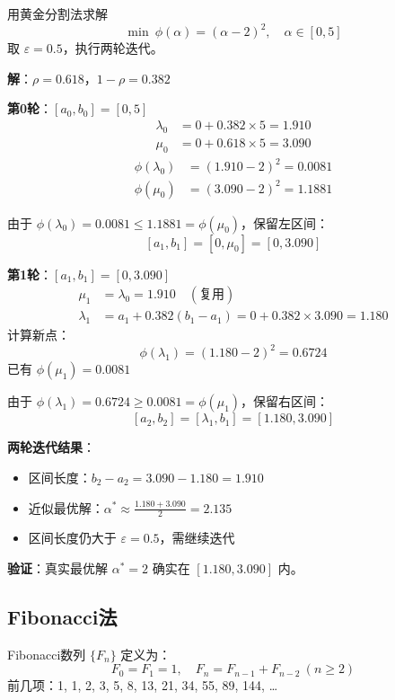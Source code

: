 \begin{example}\label{ex:golden}
用黄金分割法求解
\[
\min\ \phi(\alpha) = (\alpha - 2)^2,\quad \alpha \in [0, 5]
\]
取 $\varepsilon = 0.5$，执行两轮迭代。

\textbf{解}：$\rho = 0.618$，$1-\rho = 0.382$

\textbf{第0轮}：$[a_0, b_0] = [0, 5]$
\begin{align*}
\lambda_0 &= 0 + 0.382 \times 5 = 1.910 \\
\mu_0 &= 0 + 0.618 \times 5 = 3.090
\end{align*}
\begin{align*}
\phi(\lambda_0) &= (1.910 - 2)^2 = 0.0081 \\
\phi(\mu_0) &= (3.090 - 2)^2 = 1.1881
\end{align*}

由于 $\phi(\lambda_0) = 0.0081 \leq 1.1881 = \phi(\mu_0)$，保留左区间：
\[
[a_1, b_1] = [0, \mu_0] = [0, 3.090]
\]

\textbf{第1轮}：$[a_1, b_1] = [0, 3.090]$
\begin{align*}
\mu_1 &= \lambda_0 = 1.910 \quad (\text{复用}) \\
\lambda_1 &= a_1 + 0.382(b_1 - a_1) = 0 + 0.382 \times 3.090 = 1.180
\end{align*}
计算新点：
\[
\phi(\lambda_1) = (1.180 - 2)^2 = 0.6724
\]
已有 $\phi(\mu_1) = 0.0081$

由于 $\phi(\lambda_1) = 0.6724 \geq 0.0081 = \phi(\mu_1)$，保留右区间：
\[
[a_2, b_2] = [\lambda_1, b_1] = [1.180, 3.090]
\]

\textbf{两轮迭代结果}：
\begin{itemize}
    \item 区间长度：$b_2 - a_2 = 3.090 - 1.180 = 1.910$
    \item 近似最优解：$\alpha^* \approx \frac{1.180 + 3.090}{2} = 2.135$
    \item 区间长度仍大于 $\varepsilon = 0.5$，需继续迭代
\end{itemize}

\textbf{验证}：真实最优解 $\alpha^* = 2$ 确实在 $[1.180, 3.090]$ 内。
\end{example}

\subsection{Fibonacci法}

\begin{conceptbox}[Fibonacci数列]
Fibonacci数列 $\{F_n\}$ 定义为：
\[
F_0 = F_1 = 1,\quad F_n = F_{n-1} + F_{n-2}\ (n \geq 2)
\]
前几项：1, 1, 2, 3, 5, 8, 13, 21, 34, 55, 89, 144, \ldots
\end{conceptbox}

